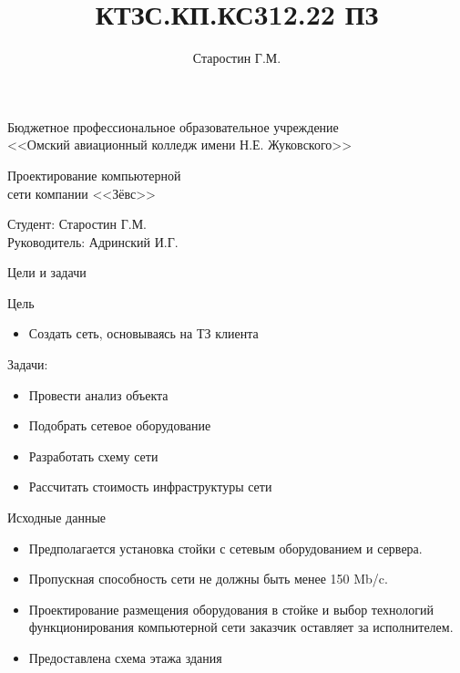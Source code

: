 \documentclass[aspectratio=169]{beamer}
\title{КТЗС.КП.КС312.22 ПЗ}
\author{Старостин Г.М.}
\begin{document}
	
\begin{frame}
	\centering
	 \begin{center}
		Бюджетное профессиональное образовательное учреждение\\
		<<Омский авиационный колледж имени Н.Е. Жуковского>>
	 \end{center}
	 
	 \vspace{1cm}
	 
	 \parbox{0.8\textwidth}{ 
	 	\fontsize{18}{19}\selectfont
	 	\centering
	 	Проектирование компьютерной\\
	 	сети компании <<Зёвс>>
	 }
	 \vspace{2cm}
	 \begin{flushleft}
	 	Студент: Старостин Г.М. \\
	 	Руководитель: Адринский И.Г.
	 \end{flushleft}
	 \vspace{0.5cm}
\end{frame}
	
\begin{frame}{Цели и задачи}
	\begin{block}{\large Цель}
		\begin{itemize}
			\item Создать сеть, основываясь на ТЗ клиента
		\end{itemize}
	\end{block}
	
	\vspace{0.5cm}
	
	\begin{block}{\large Задачи:}
		\begin{itemize}
			\item Провести анализ объекта
			\item Подобрать сетевое оборудование
			\item Разработать схему сети
			\item Рассчитать стоимость инфраструктуры сети
		\end{itemize}
	\end{block}
	
\end{frame}

\begin{frame}{Исходные данные}
	\begin{itemize}
		\item Предполагается установка стойки с сетевым оборудованием и сервера.
		\item Пропускная способность сети не должны быть менее 150 Mb/c.
		\item Проектирование размещения оборудования в стойке и выбор технологий функционирования компьютерной сети заказчик оставляет за исполнителем.
		\item Предоставлена схема этажа здания
	\end{itemize}
\end{frame}
\end{document}
